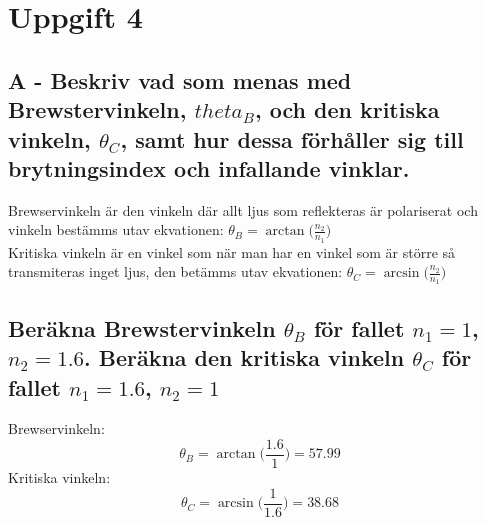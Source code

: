\documentclass{article}
\begin{document}
\section*{Uppgift 4}
  \subsection*{A - Beskriv vad som menas med Brewstervinkeln, $theta_B$, och den kritiska vinkeln, $\theta_C$, samt hur dessa förhåller sig till brytningsindex och infallande vinklar.}
    Brewservinkeln är den vinkeln där allt ljus som reflekteras är polariserat och vinkeln bestämms utav ekvationen: $\theta_B=\arctan{\big(\frac{n_2}{n_1}\big)}$\\

    Kritiska vinkeln är en vinkel som när man har en vinkel som är större så transmiteras inget ljus, den betämms utav ekvationen: $\theta_C=\arcsin{\big(\frac{n_2}{n_1}\big)}$

  \subsection*{Beräkna Brewstervinkeln $\theta_B$ för fallet $n_1=1$, $n_2=1.6$. Beräkna den kritiska vinkeln $\theta_C$ för fallet $n_1=1.6$, $n_2=1$}
    Brewservinkeln:
    \[
      \theta_B=\arctan{\big(\frac{1.6}{1}\big)}=57.99
    \]
    Kritiska vinkeln:
    \[
      \theta_C=\arcsin{\big(\frac{1}{1.6}\big)}=38.68
    \]
\end{document}
